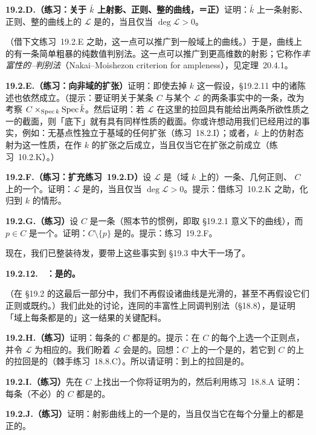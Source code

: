 \textbf{19.2.D.（练习：关于 $\bar{k}$ 上射影、正则、整的曲线，\trAmple{}＝正\trDegree）}\quad 证明：$\bar{k}$ 上一条射影、正则、整的曲线上的\trInvertibleSheaf{} $\mathscr{L}$ 是\trAmple{}的，当且仅当 $\deg\mathscr{L}>0$。

（借下文\mbox{练习~19.2.E} 之助，这一点可以推广到一般域上的曲线。）于是，曲线上\trLineBundle{}的\trAmpleness{}有一条简单粗暴的纯数值判别法。这一点可以推广到更高维数的射影\trVariety；它称作\emph{丰富性的\trNakai--\trMoishezon{}判别法}（Nakai--Moishezon criterion for ampleness），见\mbox{定理~20.4.1}。

\textbf{19.2.E.（练习：向非\trAlgClosed{}域的扩张）}\quad 证明：即使去掉 $k$ \trAlgClosed{}这一假设，\S19.2.11 中的诸陈述也依然成立。（提示：要证明关于某条\trCurve{} $C$ 与某个\trLineBundle{} $\mathscr{L}$ 的两条事实中的一条，改为考察 $C\times_{\operatorname{Spec} k}\operatorname{Spec}\bar{k}$。然后证明：若 $\mathscr{L}$ 在这里的拉回具有能给出两条所欲性质之一的截面，则「底下」就有具有同样性质的截面。你或许想动用我们已经用过的事实，例如：无基点性独立于基域的任何扩张（\mbox{练习~18.2.I}）；或者，$k$ 上的仿射态射为\trClosedEmbedding{}这一性质，在作 $k$ 的扩张之后成立，当且仅当它在扩张之前成立（\mbox{练习~10.2.K}）。）

\textbf{19.2.F.（练习：扩充\mbox{练习~19.2.D}）}\quad 设 $\mathscr{L}$ 是（域 $k$ 上的）一条\trProjective{}、几何正则、\trGeometricallyIntegral{}\trCurve{} $C$ 上的一个\trInvertibleSheaf。证明：$\mathscr{L}$ 是\trAmple{}的，当且仅当 $\deg\mathscr{L}>0$。提示：借\mbox{练习~10.2.K} 之助，化归到 $k$ \trAlgClosed{}的情形。

\textbf{19.2.G.（练习）}\quad 设 $C$ 是一条\trCurve（照本节的惯例，即取 \S19.2.1 意义下的曲线），而 $p\in C$ 是一个\trClosedPoint。证明：$C\setminus\{p\}$ 是\trAffine{}的。提示：\mbox{练习~19.2.F}。

现在，我们已整装待发，要带上这些事实到 \S19.3 中大干一场了。

\textbf{19.2.12.}\ \hard\ \textbf{\trhRemark：\trProper{}\trCurve{}是\trProjective{}的。}

（在 \S19.2 的这最后一部分中，我们不再假设诸曲线是光滑的，甚至不再假设它们正则或既约。）我们此处的讨论，连同\trSerre{}的丰富性上同调判别法（\S18.8），是证明「域上每条\trProper{}\trCurve{}都是\trProjective{}的」这一结果的关键配料。

\textbf{19.2.H.（练习）}\quad 证明：每条\trReduced{}的\trProper{}\trCurve{} $C$ 都是\trProjective{}的。提示：在 $C$ 的每个\trIrreducibleComponent{}上选一个正则点，并令 $\mathscr{L}$ 为相应的\trInvertibleSheaf。我们盼着 $\mathscr{L}$ 会是\trAmple{}的。回想：$C$ 上的一个\trLineBundle{}是\trAmple{}的，若它到 $C$ 的\trNormalization{}上的拉回是\trAmple{}的（\mbox{棘手练习~18.8.C}）。所以请证明：到\trNormalization{}上的拉回是\trAmple{}的。

\textbf{19.2.I.（练习）}\quad 先在 $C$ 上找出一个你将证明为\trAmple{}的\trInvertibleSheaf，然后利用\mbox{练习~18.8.A} 证明：每条\trProper{}（不必\trReduced）的\trCurve{} $C$ 都是\trProjective{}的。

\textbf{19.2.J.（练习）}\quad 证明：射影曲线上的一个\trLineBundle{}是\trAmple{}的，当且仅当它在每个分量上的\trDegree{}都是正的。

